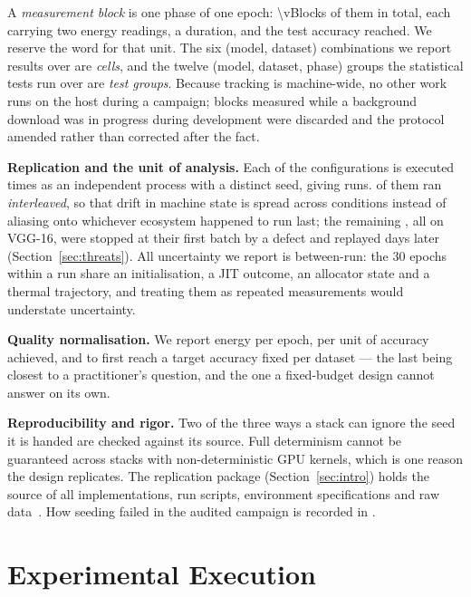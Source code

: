 A \emph{measurement block} is one phase of one epoch: \num{\vBlocks} of them in
total, each carrying two energy readings, a duration, and the test accuracy
reached. We reserve the word for that unit. The six (model, dataset)
combinations we report results over are \emph{cells}, and the twelve
(model, dataset, phase) groups the statistical tests run over are \emph{test
groups}. Because
tracking is machine-wide, no other work runs on the host during a campaign;
blocks measured while a background download was in progress during development
were discarded and the protocol amended rather than corrected after the fact.

\textbf{Replication and the unit of analysis.} Each of the \vConfigurations{}
configurations is executed \vRepetitions{} times as an independent process with
a distinct seed, giving \vRuns{} runs. \vInterleavedRuns{} of them ran
\emph{interleaved}, so that drift in machine state is spread across conditions
instead of aliasing onto whichever ecosystem happened to run last; the remaining
\vLateRuns{}, all \vLateEcosystems{} on VGG-16, were stopped at their first batch
by a defect and replayed \vLateGapDays{} days later (Section~\ref{sec:threats}).
All uncertainty we report is between-run: the 30 epochs within a run share an
initialisation, a JIT outcome, an allocator state and a thermal trajectory, and
treating them as repeated measurements would understate uncertainty.

\textbf{Quality normalisation.} We report energy per epoch, per unit of
accuracy achieved, and to first reach a target accuracy fixed per dataset --- the
last being closest to a practitioner's question, and the one a fixed-budget
design cannot answer on its own.

\textbf{Reproducibility and rigor.} Two of the three ways a stack can ignore the
seed it is handed are checked against its source. Full determinism cannot be
guaranteed across stacks with non-deterministic GPU kernels, which is one reason
the design replicates. The replication package (Section~\ref{sec:intro}) holds
the source of all implementations, run scripts, environment specifications and
raw data~\citep{cruz2025greening,verdecchia2023systematic,feldt2010validity,sjoberg2023construct}.
How seeding failed in the audited campaign is recorded in .

\section{Experimental Execution}
\label{sec:execution}

